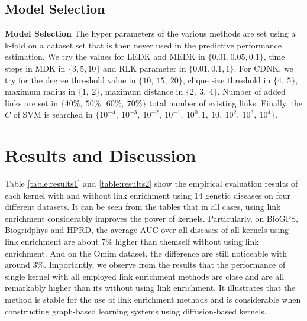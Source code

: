 \documentclass[runningheads,a4paper]{llncs}
\begin{document}
\subsection{Model Selection}
\textbf{Model Selection}
The hyper parameters of the various methods are set using a k-fold on a dataset set that is then never used in the predictive performance estimation. We try the values for LEDK and MEDK in $\lbrace  0.01, 0.05, 0.1 \rbrace$, time steps in MDK in $\lbrace 3, 5, 10 \rbrace$ and RLK parameter in $\lbrace 0.01, 0.1, 1 \rbrace$. For CDNK, we try for the degree threshold value in $\lbrace 10,\ 15,\ 20 \rbrace$, clique size threshold in $\lbrace 4,\ 5 \rbrace$, maximum radius in $\lbrace 1,\ 2 \rbrace$, maximum distance in $\lbrace 2,\ 3,\ 4 \rbrace$. Number of added links are set in $\lbrace 40\%,\ 50\%,\ 60\%,\ 70\% \rbrace$ total number of existing links. Finally, the $C$ of SVM is searched in $\lbrace 10^{-4},  \ 10^{-3}, \ 10^{-2},\ 10^{-1},\ 10^{0}, 1,\ 10,\ 10^2, \ 10^3,\ 10^4 \rbrace$.

\section{Results and Discussion}
\label{results-discussion}
Table \ref{table:results1} and \ref{table:results2} show the empirical evaluation results of each kernel with and without link enrichment using 14 genetic diseases on four different datasets. It can be seen from the tables that in all cases, using link enrichment considerably improves the power of kernels. Particularly, on BioGPS, Biogridphys and HPRD, the average AUC over all diseases of all kernels using link enrichment are about $7\%$ higher than themself without using link enrichment. And on the Omim dataset, the difference are still noticeable with around $3\%$. Importantly, we observe from the results that the performance of single kernel with all employed link enrichment methods are close and are all remarkably higher than its without using link enrichment. It illustrates that the method is stable for the use of link enrichment methods and is considerable when constructing graph-based learning systems using diffusion-based kernels.
\end{document}
